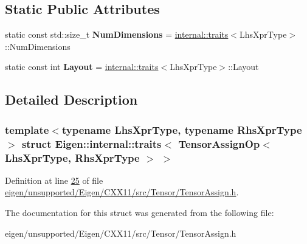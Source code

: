 \subsection*{Static Public Attributes}
\begin{DoxyCompactItemize}
\item 
\mbox{\label{struct_eigen_1_1internal_1_1traits_3_01_tensor_assign_op_3_01_lhs_xpr_type_00_01_rhs_xpr_type_01_4_01_4_a5531dac3b7b2955485e0dc245e8ff667}} 
static const std\+::size\+\_\+t {\bfseries Num\+Dimensions} = \hyperlink{struct_eigen_1_1internal_1_1traits}{internal\+::traits}$<$Lhs\+Xpr\+Type$>$\+::Num\+Dimensions
\item 
\mbox{\label{struct_eigen_1_1internal_1_1traits_3_01_tensor_assign_op_3_01_lhs_xpr_type_00_01_rhs_xpr_type_01_4_01_4_a79846438d12e7a48bcff2cb5ba17e22a}} 
static const int {\bfseries Layout} = \hyperlink{struct_eigen_1_1internal_1_1traits}{internal\+::traits}$<$Lhs\+Xpr\+Type$>$\+::Layout
\end{DoxyCompactItemize}


\subsection{Detailed Description}
\subsubsection*{template$<$typename Lhs\+Xpr\+Type, typename Rhs\+Xpr\+Type$>$\newline
struct Eigen\+::internal\+::traits$<$ Tensor\+Assign\+Op$<$ Lhs\+Xpr\+Type, Rhs\+Xpr\+Type $>$ $>$}



Definition at line \hyperlink{eigen_2unsupported_2_eigen_2_c_x_x11_2src_2_tensor_2_tensor_assign_8h_source_l00025}{25} of file \hyperlink{eigen_2unsupported_2_eigen_2_c_x_x11_2src_2_tensor_2_tensor_assign_8h_source}{eigen/unsupported/\+Eigen/\+C\+X\+X11/src/\+Tensor/\+Tensor\+Assign.\+h}.



The documentation for this struct was generated from the following file\+:\begin{DoxyCompactItemize}
\item 
eigen/unsupported/\+Eigen/\+C\+X\+X11/src/\+Tensor/\+Tensor\+Assign.\+h\end{DoxyCompactItemize}
